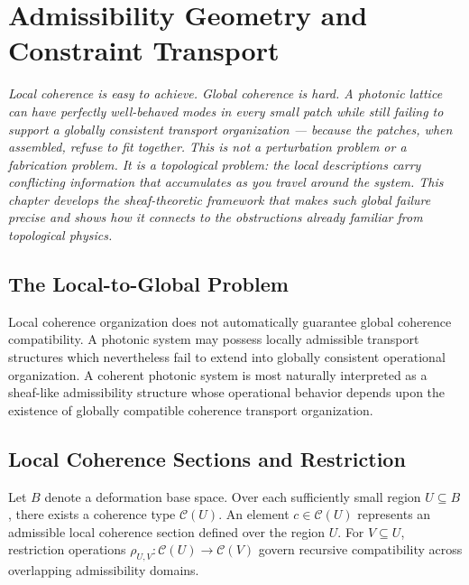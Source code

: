 \documentclass[11pt,openany]{book}
\theoremstyle{definition}
\theoremstyle{plain}
\begin{document}

\chapter{Admissibility Geometry and Constraint Transport}

\noindent\textit{Local coherence is easy to achieve. Global coherence is hard. A photonic lattice can have perfectly well-behaved modes in every small patch while still failing to support a globally consistent transport organization --- because the patches, when assembled, refuse to fit together. This is not a perturbation problem or a fabrication problem. It is a topological problem: the local descriptions carry conflicting information that accumulates as you travel around the system. This chapter develops the sheaf-theoretic framework that makes such global failure precise and shows how it connects to the obstructions already familiar from topological physics.}

\bigskip

\section{The Local-to-Global Problem}

Local coherence organization does not automatically guarantee global coherence compatibility. A photonic system may possess locally admissible transport structures which nevertheless fail to extend into globally consistent operational organization. A coherent photonic system is most naturally interpreted as a sheaf-like admissibility structure whose operational behavior depends upon the existence of globally compatible coherence transport organization.

\section{Local Coherence Sections and Restriction}

Let $B$ denote a deformation base space. Over each sufficiently small region $U \subseteq B$, there exists a coherence type $\mathcal{C}(U)$. An element $c \in \mathcal{C}(U)$ represents an admissible local coherence section defined over the region $U$. For $V \subseteq U$, restriction operations $\rho_{U,V} : \mathcal{C}(U) \to \mathcal{C}(V)$ govern recursive compatibility across overlapping admissibility domains.
\end{document}
